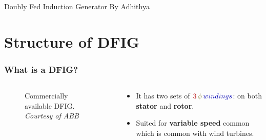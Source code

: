 \documentclass{beamer}
\date{October 3 2023}
\begin{document}
\begin{frame}{Doubly Fed Induction Generator}
\centering By Adhithya
\begin{figure}
    \centering
\end{figure}
\end{frame}

\section{Structure of DFIG}

\begin{frame}
  \frametitle{What is a DFIG?}
  \begin{columns}
    \begin{column}{0.6\textwidth} 
    \begin{figure}
        \centering
        \caption{Commercially available DFIG.
        \textit{Courtesy of ABB}}
    \end{figure}
    \end{column}
    
    \begin{column}{0.4\textwidth} %
      \begin{itemize}
        \item It has two sets of $\textcolor{red!70!black}{3} \, \textcolor{yellow!50!black}{\phi} \, \textcolor{blue!70!black}{windings}$: on both \textbf{stator} and \textbf{rotor}.
        
        \item Suited for \textbf{variable speed} common which is common with wind turbines.
      \end{itemize}
    \end{column}
  \end{columns}
\end{frame}
\end{document}

